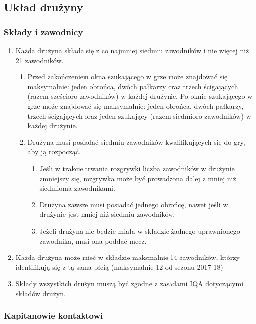 \documentclass[12pt]{article}
\begin{document}
\subsection{Układ drużyny}

\subsubsection{Składy i zawodnicy}

\begin{enumerate}
\item
    Każda drużyna składa się z co najmniej siedmiu zawodników i nie więcej
  niż 21 zawodników.
  
  \begin{enumerate}
  \item
        Przed zakończeniem okna szukającego w grze może znajdować się
    maksymalnie: jeden obrońca, dwóch pałkarzy oraz trzech ścigających
    (razem sześcioro zawodników) w każdej drużynie. Po oknie szukającego
    w grze może znajdować się maksymalnie: jeden obrońca, dwóch
    pałkarzy, trzech ścigających oraz jeden szukający (razem siedmioro
    zawodników) w każdej drużynie.
      \item
        Drużyna musi posiadać siedmiu zawodników kwalifikujących się do gry,
    aby ją rozpocząć.
    
    \begin{enumerate}
    \item
            Jeśli w trakcie trwania rozgrywki liczba zawodników w drużynie
      zmniejszy się, rozgrywka może być prowadzona dalej z mniej niż
      siedmioma zawodnikami.
          \item
            Drużyna zawsze musi posiadać jednego obrońcę, nawet jeśli w
      drużynie jest mniej niż siedmiu zawodników.
          \item
            Jeżeli drużyna nie będzie miała w składzie żadnego uprawnionego
      zawodnika, musi ona poddać mecz.
          \end{enumerate}
  \end{enumerate}
\item
    Każda drużyna może mieć w składzie maksmalnie 14 zawodników, którzy
  identifikują się z tą sama płcią (maksymalnie 12 od sezonu 2017-18)
  \item
    Składy wszystkich drużyn muszą być zgodne z zasadami IQA dotyczącymi
  składów drużyn.
  \end{enumerate}

\subsubsection{Kapitanowie kontaktowi}
\end{document}
